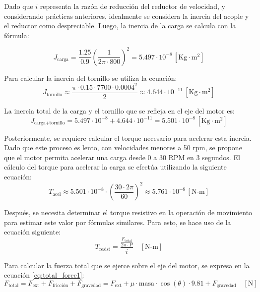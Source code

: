 \documentclass[14pt,oneside]{extarticle} %
\begin{document}
Dado que $i$ representa la razón de reducción del reductor de velocidad, y considerando prácticas anteriores, idealmente se considera la inercia del acople y el reductor como despreciable. Luego, la inercia de la carga se calcula con la fórmula:

\begin{equation}
J_{\text{carga}} = \frac{1.25}{0.9} \left(\frac{1}{2\pi \cdot 800}\right)^2 = 5.497 \cdot 10^{-8} \, [\text{Kg} \cdot \text{m}^2]
\label{eq:carga_inertia}
\end{equation}

Para calcular la inercia del tornillo se utiliza la ecuación:
\begin{equation}
J_{\text{tornillo}} \approx \frac{\pi \cdot 0.15 \cdot 7700 \cdot 0.0004^2}{2} \approx 4.644 \cdot 10^{-11} \, [\text{Kg} \cdot \text{m}^2]
\label{eq:tornillo_inertia}
\end{equation}

La inercia total de la carga y el tornillo que se refleja en el eje del motor es:
\begin{equation}
J_{\text{carga+tornillo}} = 5.497 \cdot 10^{-8} + 4.644 \cdot 10^{-11} = 5.501 \cdot 10^{-8} \, [\text{Kg} \cdot \text{m}^2]
\label{eq:total_inertia}
\end{equation}

Posteriormente, se requiere calcular el torque necesario para acelerar esta inercia. Dado que este proceso es lento, con velocidades menores a 50 rpm, se propone que el motor permita acelerar una carga desde 0 a 30 RPM en 3 segundos. El cálculo del torque para acelerar la carga se efectúa utilizando la siguiente ecuación:
\begin{equation}
T_{\text{acel}} \approx 5.501 \cdot 10^{-8} \cdot \left(\frac{30 \cdot 2\pi}{60}\right)^2 \approx 5.761 \cdot 10^{-8} \, [\text{N-m}]
\label{eq:torque_acel}
\end{equation}

Después, se necesita determinar el torque resistivo en la operación de movimiento para estimar este valor por fórmulas similares. Para esto, se hace uso de la ecuación siguiente:
\begin{equation}
T_{\text{resist}} = \frac{\frac{F_{\text{total}}}{2\pi \cdot P}}{i} \quad [\text{N-m}]
\label{eq:torque_resist}
\end{equation}

 Para calcular la fuerza total que se ejerce sobre el eje del motor, se expresa en la ecuación \ref{eq:total_force1}:
\begin{equation}
F_{\text{total}} = F_{\text{ext}} + F_{\text{fricción}} + F_{\text{gravedad}} = F_{\text{ext}} + \mu \cdot \text{masa} \cdot \cos(\theta) \cdot 9.81 + F_{\text{gravedad}} \quad [\text{N}]
\label{eq:total_force1}
\end{equation}
\end{document}
